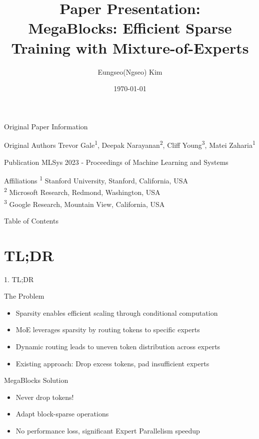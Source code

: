 \documentclass[11pt]{beamer}
\author[Ngseo Kim]{Eungseo(Ngseo) Kim}
\title[MegaBlocks]{Paper Presentation: \\ MegaBlocks: Efficient Sparse Training with Mixture-of-Experts}
\institute[]{Seoul National University, Biointelligence Lab}
\date{\today}
\begin{document}
\begin{frame}
\titlepage
\end{frame}

\begin{frame}{Original Paper Information}
    \begin{block}{Original Authors}
    Trevor Gale\textsuperscript{1}, Deepak Narayanan\textsuperscript{2}, Cliff Young\textsuperscript{3}, Matei Zaharia\textsuperscript{1}
    \end{block}
    
    \begin{block}{Publication}
    MLSys 2023 - Proceedings of Machine Learning and Systems
    \end{block}
    
    \begin{block}{Affiliations}
    \textsuperscript{1} Stanford University, Stanford, California, USA \\
    \textsuperscript{2} Microsoft Research, Redmond, Washington, USA \\
    \textsuperscript{3} Google Research, Mountain View, California, USA
    \end{block}
    
\end{frame}

\begin{frame}{Table of Contents}
\tableofcontents 
\end{frame}

\section{TL;DR}
\begin{frame}{1. TL;DR}
    \begin{block}{The Problem}
    \begin{itemize}
        \item Sparsity enables efficient scaling through conditional computation
        \item MoE leverages sparsity by routing tokens to specific experts
        \item Dynamic routing leads to uneven token distribution across experts
        \item Existing approach: Drop excess tokens, pad insufficient experts
    \end{itemize}
    \end{block}
    
    \begin{block}{MegaBlocks Solution}
    \begin{itemize}
        \item Never drop tokens!
        \item Adapt block-sparse operations
        \item No performance loss, significant Expert Parallelism speedup
    \end{itemize}
    \end{block}
\end{frame}
\end{document}
